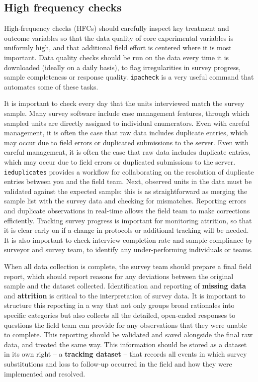 \subsection{High frequency checks}
High-frequency checks (HFCs) should carefully inspect key treatment and outcome variables so that the data quality of core experimental variables is uniformly high, and that additional field effort is centered where it is most important.
Data quality checks should be run on the data every time it is downloaded (ideally on a daily basis), to flag irregularities in survey progress, sample completeness or response quality. \texttt{ipacheck}
is a very useful command that automates some of these tasks.

It is important to check every day that the units interviewed match the survey sample.
Many survey software include case management features, through which sampled units are directly assigned to individual enumerators.
Even with careful management, it is often the case that raw data includes duplicate entries, which may occur due to field errors or duplicated submissions to the server.
Even with careful management, it is often the case that raw data includes duplicate entries, which may occur due to field errors or duplicated submissions to the server.
\texttt{ieduplicates}
provides a workflow for collaborating on the resolution of duplicate entries between you and the field team.
Next, observed units in the data must be validated against the expected sample:
this is as straightforward as merging the sample list with the survey data and checking for mismatches.
Reporting errors and duplicate observations in real-time allows the field team to make corrections efficiently.
Tracking survey progress is important for monitoring attrition, so that it is clear early on if a change in protocols or additional tracking will be needed.
It is also important to check interview completion rate and sample compliance by surveyor and survey team, to identify any under-performing individuals or teams.

When all data collection is complete, the survey team should prepare a final field report,
which should report reasons for any deviations between the original sample and the dataset collected.
Identification and reporting of \textbf{missing data} and \textbf{attrition} is critical to the interpretation of survey data.
It is important to structure this reporting in a way that not only groups broad rationales into specific categories
but also collects all the detailed, open-ended responses to questions the field team can provide for any observations that they were unable to complete.
This reporting should be validated and saved alongside the final raw data, and treated the same way.
This information should be stored as a dataset in its own right -- a \textbf{tracking dataset} -- that records all events in which survey substitutions
and loss to follow-up occurred in the field and how they were implemented and resolved.

